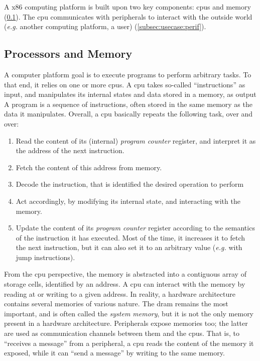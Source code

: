 A x86 computing platform is built upon two key components: \acp{cpu} and memory
(\ref{subsec:usecase:cpumem}).
%
The \ac{cpu} communicates with peripherals to interact with the outside world
(\emph{e.g.} another computing platform, a user) (\ref{subsec:usecase:perif}).

\subsection{Processors and Memory}
\label{subsec:usecase:cpumem}

A computer platform goal is to execute programs to perform arbitrary tasks.
%
To that end, it relies on one or more \acp{cpu}.
%
A \ac{cpu} takes so-called ``instructions'' as input, and manipulates its
internal states and data stored in a memory, as output
%
A program is a sequence of instructions, often stored in the same memory as the
data it manipulates.
%
Overall, a \ac{cpu} basically repeats the following task, over and over:

\begin{enumerate}
\item Read the content of its (internal) \emph{program counter} register, and
  interpret it as the address of the next instruction.
%
\item Fetch the content of this address from memory.
%
\item Decode the instruction, that is identified the desired operation to
  perform
%
\item Act accordingly, by modifying its internal state, and interacting with the
  memory.
%
\item Update the content of its \emph{program counter} register according to the
  semantics of the instruction it has executed. Most of the time, it increases
  it to fetch the next instruction, but it can also set it to an arbitrary value
  (\emph{e.g.} with jump instructions).
\end{enumerate}

From the \ac{cpu} perspective, the memory is abstracted into a contiguous array
of storage cells, identified by an address.
%
A \ac{cpu} can interact with the memory by reading at or writing to a given
address.
%
In reality, a hardware architecture contains several memories of various nature.
%
The \ac{dram} remains the most important, and is often called the \emph{system
  memory}, but it is not the only memory present in a hardware architecture.
%
Peripherals expose memories too; the latter are used as communication channels
between them and the \acp{cpu}.
%
That is, to ``receives a message'' from a peripheral, a \ac{cpu} reads the
content of the memory it exposed, while it can ``send a message'' by writing to
the same memory.

